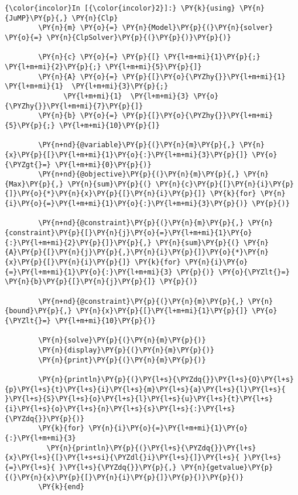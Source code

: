     \begin{Verbatim}[commandchars=\\\{\}]
{\color{incolor}In [{\color{incolor}2}]:} \PY{k}{using} \PY{n}{JuMP}\PY{p}{,} \PY{n}{Clp}
        \PY{n}{m} \PY{o}{=} \PY{n}{Model}\PY{p}{(}\PY{n}{solver} \PY{o}{=} \PY{n}{ClpSolver}\PY{p}{(}\PY{p}{)}\PY{p}{)}
        
        \PY{n}{c} \PY{o}{=} \PY{p}{[} \PY{l+m+mi}{1}\PY{p}{;} \PY{l+m+mi}{2}\PY{p}{;} \PY{l+m+mi}{5}\PY{p}{]}
        \PY{n}{A} \PY{o}{=} \PY{p}{[}\PY{o}{\PYZhy{}}\PY{l+m+mi}{1}  \PY{l+m+mi}{1}  \PY{l+m+mi}{3}\PY{p}{;}
              \PY{l+m+mi}{1}  \PY{l+m+mi}{3} \PY{o}{\PYZhy{}}\PY{l+m+mi}{7}\PY{p}{]}
        \PY{n}{b} \PY{o}{=} \PY{p}{[}\PY{o}{\PYZhy{}}\PY{l+m+mi}{5}\PY{p}{;} \PY{l+m+mi}{10}\PY{p}{]}
        
        \PY{n+nd}{@variable}\PY{p}{(}\PY{n}{m}\PY{p}{,} \PY{n}{x}\PY{p}{[}\PY{l+m+mi}{1}\PY{o}{:}\PY{l+m+mi}{3}\PY{p}{]} \PY{o}{\PYZgt{}=} \PY{l+m+mi}{0}\PY{p}{)}
        \PY{n+nd}{@objective}\PY{p}{(}\PY{n}{m}\PY{p}{,} \PY{n}{Max}\PY{p}{,} \PY{n}{sum}\PY{p}{(} \PY{n}{c}\PY{p}{[}\PY{n}{i}\PY{p}{]}\PY{o}{*}\PY{n}{x}\PY{p}{[}\PY{n}{i}\PY{p}{]} \PY{k}{for} \PY{n}{i}\PY{o}{=}\PY{l+m+mi}{1}\PY{o}{:}\PY{l+m+mi}{3}\PY{p}{)} \PY{p}{)}
        
        \PY{n+nd}{@constraint}\PY{p}{(}\PY{n}{m}\PY{p}{,} \PY{n}{constraint}\PY{p}{[}\PY{n}{j}\PY{o}{=}\PY{l+m+mi}{1}\PY{o}{:}\PY{l+m+mi}{2}\PY{p}{]}\PY{p}{,} \PY{n}{sum}\PY{p}{(} \PY{n}{A}\PY{p}{[}\PY{n}{j}\PY{p}{,}\PY{n}{i}\PY{p}{]}\PY{o}{*}\PY{n}{x}\PY{p}{[}\PY{n}{i}\PY{p}{]} \PY{k}{for} \PY{n}{i}\PY{o}{=}\PY{l+m+mi}{1}\PY{o}{:}\PY{l+m+mi}{3} \PY{p}{)} \PY{o}{\PYZlt{}=} \PY{n}{b}\PY{p}{[}\PY{n}{j}\PY{p}{]} \PY{p}{)}
        
        \PY{n+nd}{@constraint}\PY{p}{(}\PY{n}{m}\PY{p}{,} \PY{n}{bound}\PY{p}{,} \PY{n}{x}\PY{p}{[}\PY{l+m+mi}{1}\PY{p}{]} \PY{o}{\PYZlt{}=} \PY{l+m+mi}{10}\PY{p}{)}
        
        \PY{n}{solve}\PY{p}{(}\PY{n}{m}\PY{p}{)}
        \PY{n}{display}\PY{p}{(}\PY{n}{m}\PY{p}{)}
        \PY{n}{print}\PY{p}{(}\PY{n}{m}\PY{p}{)}
        
        \PY{n}{println}\PY{p}{(}\PY{l+s}{\PYZdq{}}\PY{l+s}{O}\PY{l+s}{p}\PY{l+s}{t}\PY{l+s}{i}\PY{l+s}{m}\PY{l+s}{a}\PY{l+s}{l}\PY{l+s}{ }\PY{l+s}{S}\PY{l+s}{o}\PY{l+s}{l}\PY{l+s}{u}\PY{l+s}{t}\PY{l+s}{i}\PY{l+s}{o}\PY{l+s}{n}\PY{l+s}{s}\PY{l+s}{:}\PY{l+s}{\PYZdq{}}\PY{p}{)}
        \PY{k}{for} \PY{n}{i}\PY{o}{=}\PY{l+m+mi}{1}\PY{o}{:}\PY{l+m+mi}{3}
          \PY{n}{println}\PY{p}{(}\PY{l+s}{\PYZdq{}}\PY{l+s}{x}\PY{l+s}{[}\PY{l+s+si}{\PYZdl{}i}\PY{l+s}{]}\PY{l+s}{ }\PY{l+s}{=}\PY{l+s}{ }\PY{l+s}{\PYZdq{}}\PY{p}{,} \PY{n}{getvalue}\PY{p}{(}\PY{n}{x}\PY{p}{[}\PY{n}{i}\PY{p}{]}\PY{p}{)}\PY{p}{)}
        \PY{k}{end}
        

\end{Verbatim}
